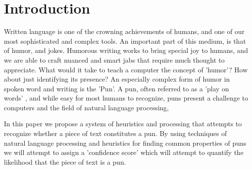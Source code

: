 \section{Introduction}

Written language is one of the crowning achievements of humans, and one of our most sophisticated and complex tools. An important part of this medium, is that of humor, and jokes. Humorous writing works to bring special joy to humans, and we are able to craft nuanced and smart jabs that require much thought to appreciate. What would it take to teach a computer the concept of 'humor'? How about just identifying its presence? An especially complex form of humor in spoken word and writing is the 'Pun'.  A pun, often referred to as a 'play on words' , and while easy for most humans to recognize, puns present a challenge to computers and the field of natural language processing,

In this paper we propose a system of heuristics and processing that attempts to recognize whether a piece of text constitutes a pun. By using techniques of natural language processing and heuristics for finding common properties of puns we will attempt to assign a 'confidence score' which will attempt to quantify the likelihood that the piece of text is a pun.
